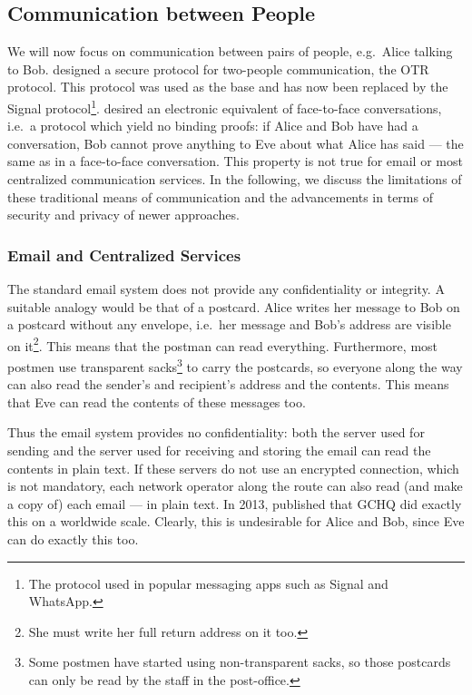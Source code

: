 \subsection{Communication between People}
\label{Communicating}

We will now focus on communication between pairs of people, e.g.\ Alice talking 
to Bob.
\citeauthor{otr2004} designed a secure protocol for two-people communication, 
the \ac{OTR} protocol.
This protocol was used as the base and has now been replaced by the Signal 
protocol\footnote{%
  The protocol used in popular messaging apps such as Signal and WhatsApp.
}.
\citeauthor{otr2004} desired an electronic equivalent of face-to-face 
conversations, i.e.\ a protocol which yield no binding proofs:
if Alice and Bob have had a conversation, Bob cannot prove anything to Eve 
about what Alice has said --- the same as in a face-to-face conversation.
This property is not true for email or most centralized communication
services. In the following, we discuss the limitations of these
traditional means of communication and the advancements in terms of
security and privacy of newer approaches.

\subsubsection{Email and Centralized Services}

The standard email system does not provide any confidentiality or 
integrity.
A suitable analogy would be that of a postcard.
Alice writes her message to Bob on a postcard without any envelope, i.e.\ her 
message and Bob's address are visible on it\footnote{%
  She must write her full return address on it too.
}.
This means that the postman can read everything.
Furthermore, most postmen use transparent sacks\footnote{%
  Some postmen have started using non-transparent sacks, so those postcards can 
  only be read by the staff in the post-office.
} to carry the postcards, so everyone along the way can also read the sender's 
and recipient's address and the contents.
This means that Eve can read the contents of these messages too.

Thus the email system provides no confidentiality: both the server used for 
sending and the server used for receiving and storing the email can read the 
contents in plain text.
If these servers do not use an encrypted connection, which is not mandatory, 
each network operator along the route can also read (and make a copy of) each 
email --- in plain text.
In 2013, \textcite{Fibretap} published that \ac{GCHQ} did exactly this on 
a worldwide scale.
Clearly, this is undesirable for Alice and Bob, since Eve can do exactly this 
too.

